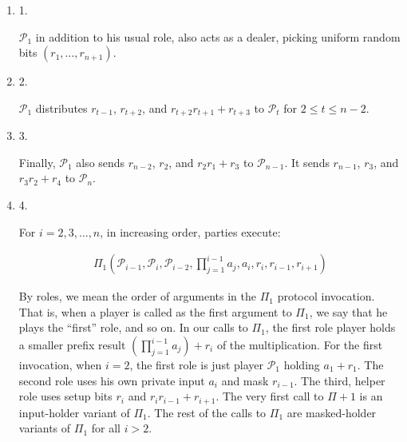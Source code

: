 \begin{enumerate}


\item[] 
1. 


$\mathcal{P}_{1}$ in addition to his usual role, also acts as a dealer, picking uniform random bits $(r_{1},\dots,r_{n+1})$.\par





\item[] 
2. 


$\mathcal{P}_{1}$ distributes $r_{t-1}$, $r_{t+2}$, and $r_{t+2}r_{t+1}+r_{t+3}$ to $\mathcal{P}_{t}$ for $2\leq t\leq n-2$.\par





\item[] 
3. 


Finally, $\mathcal{P}_{1}$ also sends $r_{n-2}$, $r_{2}$, and $r_{2}r_{1}+r_{3}$ to $\mathcal{P}_{n-1}$. It sends $r_{n-1}$, $r_{3}$, and $r_{3}r_{2}+r_{4}$ to $\mathcal{P}_{n}$.\par





\item[] 
4. 


For $i=2,3,\dots,n$, in increasing order, parties execute:\par


\[\begin{gathered}
\Pi_{1}\!\left(\mathcal{P}_{i-1},\mathcal{P}_{i},\mathcal{P}_{i-2},\prod_{j=1}^{i-1}a_{j},a_{i},r_{i},r_{i-1},r_{i+1}\right)
\end{gathered}\]


By roles, we mean the order of arguments in the $\Pi_{1}$ protocol invocation. That is, when a player is called as the first argument to $\Pi_{1}$, we say that he plays the “first” role, and so on. In our calls to $\Pi_{1}$, the first role player holds a smaller prefix result $(\prod_{j=1}^{i-1}a_{j})+r_{i}$ of the multiplication. For the first invocation, when $i=2$, the first role is just player $\mathcal{P}_{1}$ holding $a_{1}+r_{1}$. The second role uses his own private input $a_{i}$ and mask $r_{i-1}$. The third, helper role uses setup bits $r_{i}$ and $r_{i}r_{i-1}+r_{i+1}$. The very first call to $\Pi+1$ is an input-holder variant of $\Pi_{1}$. The rest of the calls to $\Pi_{1}$ are masked-holder variants of $\Pi_{1}$ for all $i>2$.\par






\end{enumerate}
